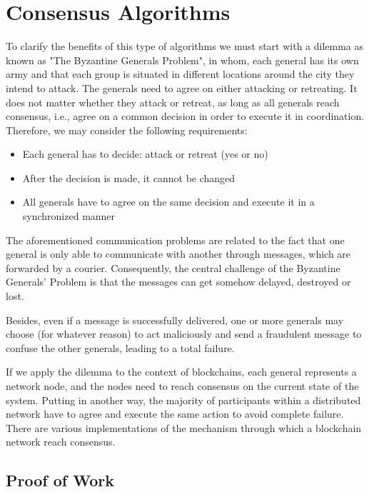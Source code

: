 \section{Consensus Algorithms}
\label{sec:consensus}

To clarify the benefits of this type of algorithms we must start with a 
dilemma as known as "The Byzantine Generals Problem", in whom, each 
general has its own army and that each group is situated in different 
locations around the city they intend to attack. The generals need to 
agree on either attacking or retreating. It does not matter whether 
they attack or retreat, as long as all generals reach consensus, 
i.e., agree on a common decision in order to execute it in coordination. 
Therefore, we may consider the following requirements:
\begin{itemize}
    \item Each general has to decide: attack or retreat (yes or no)
    \item After the decision is made, it cannot be changed
    \item All generals have to agree on the same decision and execute it in a synchronized manner
\end{itemize}
The aforementioned communication problems are related to the fact that 
one general is only able to communicate with another through messages, 
which are forwarded by a courier. Consequently, the central challenge 
of the Byzantine Generals’ Problem is that the messages can get somehow 
delayed, destroyed or lost.

Besides, even if a message is successfully delivered, one or more 
generals may choose (for whatever reason) to act maliciously and send 
a fraudulent message to confuse the other generals, leading to a total 
failure.

If we apply the dilemma to the context of blockchains, each general 
represents a network node, and the nodes need to reach consensus on 
the current state of the system. Putting in another way, the majority 
of participants within a distributed network have to agree and execute 
the same action to avoid complete failure.\cite{byzantine}\cite{binancevision}
There are various implementations of the mechanism through which a blockchain 
network reach consensus.


\subsection{Proof of Work}
\label{sec:pow}

